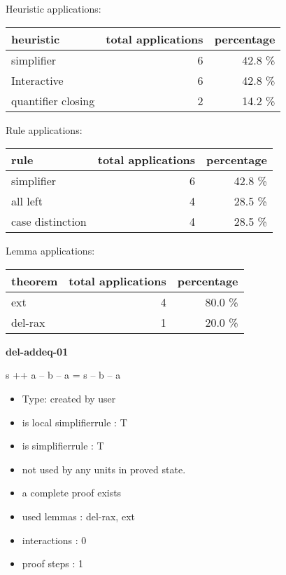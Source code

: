 \documentclass[a4paper]{article}
\begin{document}
\medskip


Heuristic applications:

\begin{supertabular}{l|r|r}
heuristic	& total applications & percentage \\ \hline
simplifier & 6 & 42.8 \% \\
Interactive & 6 & 42.8 \% \\
quantifier closing & 2 & 14.2 \% \\

\end{supertabular}

Rule applications:

\begin{supertabular}{l|r|r}
rule	        & total applications & percentage \\ \hline
simplifier & 6 & 42.8 \% \\
all left & 4 & 28.5 \% \\
case distinction & 4 & 28.5 \% \\

\end{supertabular}

Lemma applications:

\begin{supertabular}{l|r|r}
theorem	        & total applications & percentage \\ \hline
ext & 4 & 80.0 \% \\
del-rax & 1 & 20.0 \% \\

\end{supertabular}
\pagebreak

{\LARGE\bf del-addeq-01}\label{lemma-del-addeq-01}

\medskip

 \Fol s ++ a -- b -- a = s -- b -- a

\begin{itemize}

\item Type: created by user

\item is local simplifierrule : T
\item is simplifierrule : T
\item not used by any units in proved state.
\item       a complete proof exists
\item       used lemmas  : del-rax, ext
\item       interactions : 0
\item       proof steps  : 1
\end{itemize}
\end{document}
